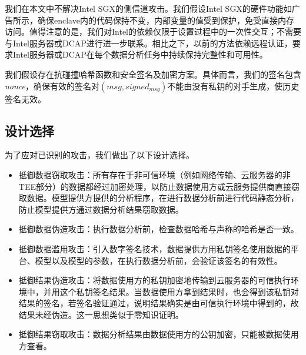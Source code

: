 我们在本文中不解决Intel SGX的侧信道攻击。我们假设Intel SGX的硬件功能如广告所示，确保enclave内的代码保持不变，内部变量的值受到保护，免受直接内存访问。值得注意的是，我们对Intel的依赖仅限于设置过程中的一次性交互；不需要与Intel服务器或DCAP进行进一步联系。相比之下，以前的方法依赖远程认证，要求Intel服务器或DCAP在每个数据分析任务中持续保持完整性和可用性。

我们假设存在抗碰撞哈希函数和安全签名及加密方案。具体而言，我们的签名包含\textit{nonce}，确保有效的签名对$(msg, signed_{msg})$不能由没有私钥的对手生成，使历史签名无效。

\subsection{设计选择}\label{subsec:designchoice}
为了应对已识别的攻击，我们做出了以下设计选择。
\begin{itemize}
    \item 抵御数据窃取攻击：所有存在于非可信环境（例如网络传输、云服务器的非TEE部分）的数据都经过加密处理，以防止数据使用方或云服务提供商直接窃取数据。模型提供方提供的分析程序，在进行数据分析前进行代码静态分析，防止模型提供方通过数据分析结果窃取数据。
    \item 抵御数据伪造攻击：执行数据分析前，检查数据哈希与声称的哈希是否一致。
    \item 抵御数据滥用攻击：引入数字签名技术，数据提供方用私钥签名使用数据的平台、模型以及模型的参数，在执行数据分析前，会验证该签名的有效性。
    \item 抵御结果伪造攻击：将数据使用方的私钥加密地传输到云服务器的可信执行环境中，并用这个私钥签名结果。当数据使用方拿到结果时，也会得到该私钥对结果的签名，若签名验证通过，说明结果确实是由可信执行环境中得到的，故结果未经伪造。这一思想类似于零知识证明。
    \item 抵御结果窃取攻击：数据分析结果由数据使用方的公钥加密，只能被数据使用方查看。
\end{itemize} 
